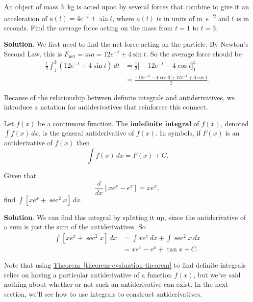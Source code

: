 \documentclass[10pt,]{book}
\newcommand{\terminology}[1]{\textbf{#1}}
\theoremstyle{ptxplainnotitle}
\theoremstyle{ptxplaintitle}
\theoremstyle{ptxplainnotitle}
\theoremstyle{ptxplaintitle}
\theoremstyle{ptxplainnotitle}
\theoremstyle{ptxplaintitle}
\theoremstyle{ptxdefinitionnotitle}
\theoremstyle{ptxdefinitiontitle}
\theoremstyle{ptxdefinitionnotitle}
\theoremstyle{ptxdefinitiontitle}
\theoremstyle{ptxdefinitionnotitle}
\theoremstyle{ptxdefinitiontitle}
\theoremstyle{ptxdefinitionnotitle}
\theoremstyle{ptxdefinitiontitle}
\theoremstyle{ptxdefinitionnotitle}
\theoremstyle{ptxdefinitiontitle}
\numberwithin{equation}{section}
\newcommand{\dv}[3][]{\dfrac{d^{#1} #2}{d #3^{#1}}}
\begin{document}
\begin{example}\label{example-average-force}
\hypertarget{p-453}{}%
An object of mass \SI{3}{\kilo\gram} is acted upon by several forces that combine to give it an acceleration of \(a(t) = 4e^{-t} + \sin t\), where \(a(t)\) is in units of \si{\meter\per\second\tothe{2}} and \(t\) is in seconds. Find the average force acting on the mass from \(t=1\) to \(t=3\).%
\par\smallskip%
\noindent\textbf{Solution}.\hypertarget{solution-99}{}\quad%
\hypertarget{p-454}{}%
We first need to find the net force acting on the particle. By Newton's Second Law, this is \(F_{\text{net}} = ma = 12e^{-t} + 4\sin t\). So the average force should be%
\begin{align*}
\frac{1}{2}\int_{1}^{3}(12e^{-t} + 4\sin t)\,dt & =  \frac{1}{2}\big[-12e^{-t} - 4\cos t\big]_{1}^{3}\\
& = \frac{-12e^{-3} - 4\cos 3 + 12e^{-1} + 4\cos1}{2}. 
\end{align*}
%
\end{example}
\hypertarget{p-455}{}%
Because of the relationship between definite integrals and antiderivatives, we introduce a notation for antiderivatives that reinforces this connect.%
\begin{definition}\label{definition-indefinite-integral}
\hypertarget{p-456}{}%
Let \(f(x)\) be a continuous function. The \terminology{indefinite integral} of \(f(x)\), denoted \(\int f(x)\,dx\), is the general antiderivative of \(f(x)\). In symbols, if \(F(x)\) is an antiderivative of \(f(x)\) then%
\begin{equation*}
\int f(x)\,dx = F(x) + C.
\end{equation*}
%
\end{definition}
\begin{example}\label{example-finding-an-indefinite-integral}
\hypertarget{p-457}{}%
Given that%
\begin{equation*}
\dv{}{x}[xe^{x} - e^{x}] = xe^{x},
\end{equation*}
find \(\int [xe^{x}+\sec^{2}x]\,dx\).%
\par\smallskip%
\noindent\textbf{Solution}.\hypertarget{solution-100}{}\quad%
\hypertarget{p-458}{}%
We can find this integral by splitting it up, since the antiderivative of a sum is just the sum of the antiderivatives. So%
\begin{align*}
\int[xe^{x} + \sec^{2}x]\,dx & = \int xe^{x}\,dx + \int\sec^{2}x\,dx \\
& = xe^{x}-e^{x} + \tan x + C. 
\end{align*}
%
\end{example}
\hypertarget{p-459}{}%
Note that using \hyperref[theorem-evaluation-theorem]{Theorem~\ref{theorem-evaluation-theorem}} to find definite integrals relies on having a particular antiderivative of a function \(f(x)\), but we've said nothing about whether or not such an antiderivative can exist. In the next section, we'll see how to use integrals to construct antiderivatives.%
\typeout{************************************************}
\typeout{************************************************}
\end{document}
